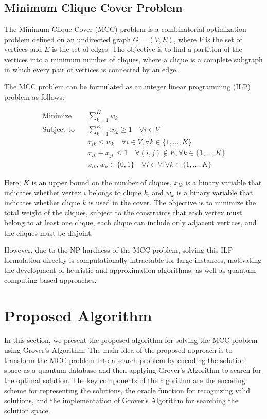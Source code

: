 \subsection{Minimum Clique Cover Problem}

The Minimum Clique Cover (MCC) problem is a combinatorial optimization problem defined on an undirected graph $G=(V,E)$, where $V$ is the set of vertices and $E$ is the set of edges. The objective is to find a partition of the vertices into a minimum number of cliques, where a clique is a complete subgraph in which every pair of vertices is connected by an edge.

The MCC problem can be formulated as an integer linear programming (ILP) problem as follows:

\begin{align}
\text{Minimize} \quad & \sum_{k=1}^{K} w_k \\
\text{Subject to} \quad & \sum_{k=1}^{K} x_{ik} \ge 1 \quad \forall i \in V \\
& x_{ik} \le w_k \quad \forall i \in V, \forall k \in \{1, \dots, K\} \\
& x_{ik} + x_{jk} \le 1 \quad \forall (i, j) \notin E, \forall k \in \{1, \dots, K\} \\
& x_{ik}, w_k \in \{0, 1\} \quad \forall i \in V, \forall k \in \{1, \dots, K\}
\end{align}

Here, $K$ is an upper bound on the number of cliques, $x_{ik}$ is a binary variable that indicates whether vertex $i$ belongs to clique $k$, and $w_k$ is a binary variable that indicates whether clique $k$ is used in the cover. The objective is to minimize the total weight of the cliques, subject to the constraints that each vertex must belong to at least one clique, each clique can include only adjacent vertices, and the cliques must be disjoint.

However, due to the NP-hardness of the MCC problem, solving this ILP formulation directly is computationally intractable for large instances, motivating the development of heuristic and approximation algorithms, as well as quantum computing-based approaches.

\section{Proposed Algorithm}\label{sec:algorithm}

In this section, we present the proposed algorithm for solving the MCC problem using Grover's Algorithm. The main idea of the proposed approach is to transform the MCC problem into a search problem by encoding the solution space as a quantum database and then applying Grover's Algorithm to search for the optimal solution. The key components of the algorithm are the encoding scheme for representing the solutions, the oracle function for recognizing valid solutions, and the implementation of Grover's Algorithm for searching the solution space.

